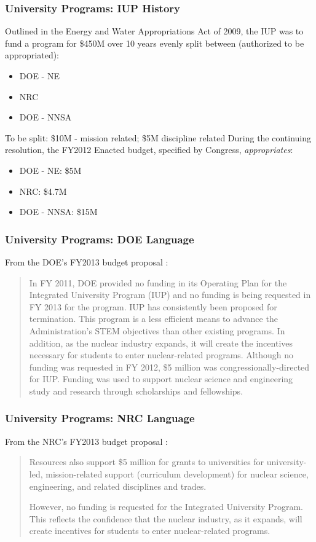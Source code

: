\begin{frame}[ctb!]
  \frametitle{University Programs: IUP History}
  Outlined in the Energy and Water Appropriations Act of
  2009, the IUP was to fund a program for \$450M over 10 
  years evenly split between (authorized to be appropriated):
  \begin{itemize}
    \item DOE - NE
    \item NRC
    \item DOE - NNSA
  \end{itemize}
  To be split: \$10M - mission related; \$5M discipline related
  \pause
  During the continuing resolution, the FY2012 Enacted budget,
  specified by Congress, \emph{appropriates}:
  \begin{itemize}
    \item DOE - NE: \$5M
    \item NRC: \$4.7M
    \item DOE - NNSA: \$15M
  \end{itemize}
\end{frame}


\begin{frame}[ctb!]
  \frametitle{University Programs: DOE Language}  
  From the DOE's FY2013 budget proposal \cite{doe_budget_2013}:
  \begin{quote}
    In FY 2011, DOE provided no funding in its Operating Plan 
    for the Integrated University Program (IUP) and no funding 
    is being requested in FY 2013 for the program.  IUP has 
    consistently been proposed for termination.  This program is 
    a less efficient means to advance the Administration’s STEM 
    objectives than other existing programs.  In addition, as the 
    nuclear industry expands, it will create the incentives 
    necessary for students to enter nuclear-related programs. 
    Although no funding was requested in FY 2012, \$5 million was 
    congressionally-directed for IUP.  Funding was used to support 
    nuclear science and engineering study and research through 
    scholarships and fellowships. 
  \end{quote}
\end{frame}

\begin{frame}[ctb!]
  \frametitle{University Programs: NRC Language}  
  From the NRC's FY2013 budget proposal \cite{nrc_budget_2013}:
  \begin{quote}
    Resources also support \$5 million for grants to universities 
    for university-led, mission-related support (curriculum development) 
    for nuclear science, engineering, and related disciplines and trades.

    However, no funding is requested for the Integrated University Program.  
    This reflects the confidence that the nuclear industry, as it expands, 
    will create incentives for students to enter nuclear-related programs.
  \end{quote}
\end{frame}

